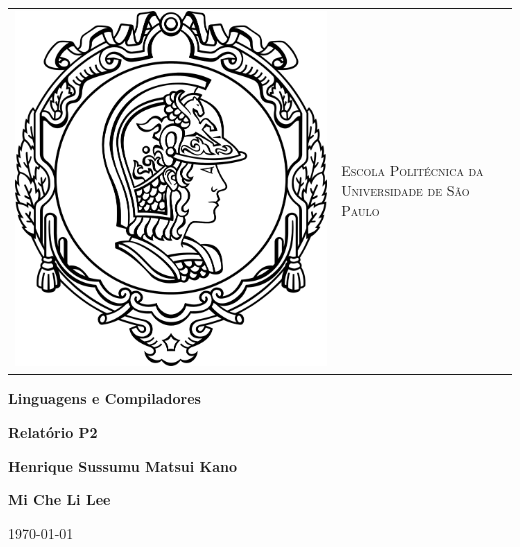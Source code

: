 \begin{titlepage}

\begin{center}

\small

\begin{tabularx}{\linewidth}{ c X }

\parbox[c]{3cm}{
\includegraphics[width=\linewidth]{figuras/minerva}} &
\begin{center}
\textsf{\textsc{Escola Politécnica da Universidade de São Paulo
}} 
\end{center}

\end{tabularx}

\vfill

\vfill

\LARGE

\textbf{Linguagens e Compiladores}

\vfill

\vfill

\large

\textbf{Relatório P2}

\vfill

\vfill

\textbf{Henrique Sussumu Matsui Kano}

\textbf{Mi Che Li Lee}

\vfill

\vfill

\large

\today

\end{center}

\end{titlepage}
